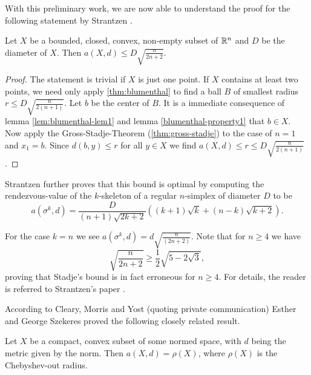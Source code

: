 With this preliminary work, we are now able to understand the proof for the following statement by Strantzen \cite{strantzen}.

\begin{theorem}
	Let $X$ be a bounded, closed, convex, non-empty subset of $\mathbb{R}^n$ and $D$ be the diameter of $X$. Then $a(X,d)\leq D\sqrt{\frac{n}{2n+2}}$.
\end{theorem}
\begin{proof}
	The statement is trivial if $X$ is just one point. If $X$ contains at least two points, we need only apply \autoref{thm:blumenthal} to find a ball $B$ of smallest radius $r\leq D\sqrt{\frac{n}{2(n+1)}}$. Let $b$ be the center of $B$. It is a immediate consequence of lemma \ref{lem:blumenthal-lem1} and lemma \ref{blumenthal-property1} that $b\in X$. Now apply the Gross-Stadje-Theorem (\autoref{thm:gross-stadje}) to the case of $n=1$ and $x_1=b$. Since $d(b,y)\leq r$ for all $y\in X$ we find $a(X,d)\leq r\leq D\sqrt{\frac{n}{2(n+1)}}$.
\end{proof}

Strantzen further proves that this bound is optimal by computing the rendezvous-value of the $k$-skeleton of a regular $n$-simplex of diameter $D$ to be
\[
a(\sigma^k,d)=\frac{D}{(n+1)\sqrt{2k+2}}((k+1)\sqrt{k}+(n-k)\sqrt{k+2}).
\]

For the case $k=n$ we see $a(\sigma^k,d)=d\sqrt{\frac{n}{(2n+2)}}$. Note that for $n\geq 4$ we have
\[
\sqrt{\frac{n}{2n+2}}\geq\frac{1}{2}\sqrt{5-2\sqrt{3}},
\]
proving that Stadje's bound is in fact erroneous for $n\geq 4$. For details, the reader is referred to Strantzen's paper \cite{strantzen}.


According to Cleary, Morris and Yost \cite{cleary:numbers-of-shapes} (quoting private communication) Esther and George Szekeres proved the following closely related result.

\begin{theorem}
	Let $X$ be a compact, convex subset of some normed space, with $d$ being the metric given by the norm. Then $a(X,d)=\rho(X)$, where $\rho(X)$ is the Chebyshev-out radius.
\end{theorem}

